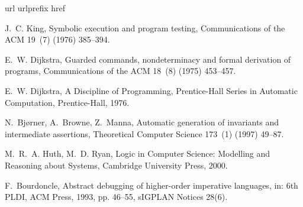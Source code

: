 \documentclass[times]{elsarticle}
\begin{document}
\begin{thebibliography}{1}
\expandafter\ifx\csname url\endcsname\relax
  \def\url#1{\texttt{#1}}\fi
\expandafter\ifx\csname urlprefix\endcsname\relax\def\urlprefix{URL }\fi
\expandafter\ifx\csname href\endcsname\relax
  \def\href#1#2{#2} \def\path#1{#1}\fi

J.~C. King, Symbolic execution and program testing, Communications of the ACM
  19~(7) (1976) 385--394.

E.~W. Dijkstra, Guarded commands, nondeterminacy and formal derivation of
  programs, Communications of the ACM 18~(8) (1975) 453--457.

E.~W. Dijkstra, A Discipline of Programming, Prentice-Hall Series in Automatic
  Computation, Prentice-Hall, 1976.

N.~Bj{\o}rner, A.~Browne, Z.~Manna, Automatic generation of invariants and
  intermediate assertions, Theoretical Computer Science 173~(1) (1997) 49--87.

M.~R.~A. Huth, M.~D. Ryan, Logic in Computer Science: Modelling and Reasoning
  about Systems, Cambridge University Press, 2000.

F.~Bourdoncle, Abstract debugging of higher-order imperative languages, in: 6th
  PLDI, ACM Press, 1993, pp. 46--55, sIGPLAN Notices 28(6).

\end{thebibliography}
\end{document}
